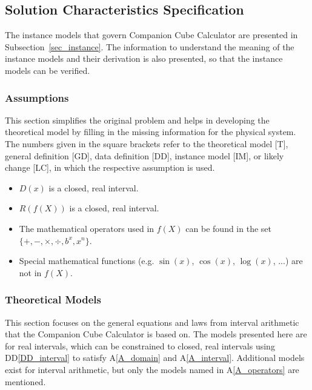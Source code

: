 \documentclass[12pt]{article}
\newcommand{\ddref}[1]{DD\ref{#1}}
\newcounter{assumpnum} %
\newcommand{\aref}[1]{A\ref{#1}}
\newcommand{\progname}{Companion Cube Calculator} %
\begin{document}
\subsection{Solution Characteristics Specification}
The instance models that govern \progname{} are presented in
Subsection~\ref{sec_instance}. The information to understand the meaning of the
instance models and their derivation is also presented, so that the instance
models can be verified.

\subsubsection{Assumptions}
This section simplifies the original problem and helps in developing the
theoretical model by filling in the missing information for the physical
system. The numbers given in the square brackets refer to the theoretical model
[T], general definition [GD], data definition [DD], instance model [IM], or
likely change [LC], in which the respective assumption is used.

\begin{itemize}

\item[A\refstepcounter{assumpnum}\theassumpnum \label{A_domain}:] $D(x)$ is a 
closed, real interval. 

\item[A\refstepcounter{assumpnum}\theassumpnum \label{A_interval}:] $R(f(X))$ 
is a closed, real interval.

\item[A\refstepcounter{assumpnum}\theassumpnum \label{A_operators}:] The 
mathematical operators used in $f(X)$ can be found in the set $\{+, -, 
\times, \div, b^x, x^n \}$.

\item[A\refstepcounter{assumpnum}\theassumpnum \label{A_commonfunctions}:] 
Special mathematical functions (e.g. $\sin(x)$, $\cos(x)$, $\log(x)$, ...) are 
not in $f(X)$.

\end{itemize}

\subsubsection{Theoretical Models}\label{sec_theoretical}

This section focuses on the general equations and laws from interval arithmetic 
that the \progname{} is based on. The models presented here are for real 
intervals, which can be constrained to closed, real intervals using 
\ddref{DD_interval} to satisfy \aref{A_domain} and \aref{A_interval}. 
Additional models exist for interval arithmetic, but only the models named in 
\aref{A_operators} are mentioned.
\end{document}
